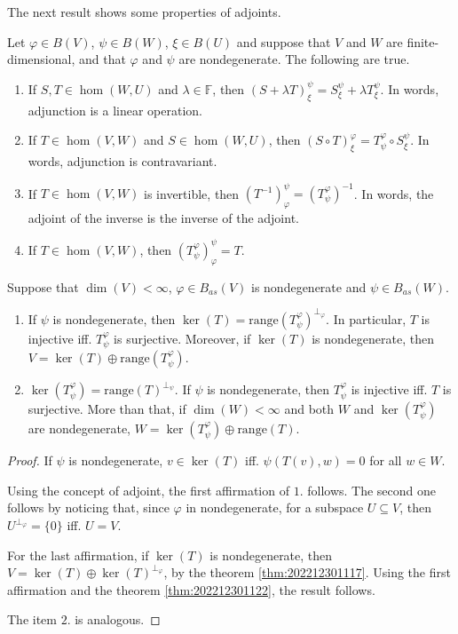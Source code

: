 The next result shows some properties of adjoints.

\begin{theorem}
  Let $\varphi \in B(V)$, $\psi \in B(W)$, $\xi \in B(U)$ and suppose that $V$ and $W$ are finite-dimensional, and that $\varphi$ and $\psi$ are nondegenerate. The following are true. 
  \begin{enumerate}
    \item If $S, T \in \hom(W, U)$ and $\lambda \in \mathbb{F}$, then $(S + \lambda T)_\xi^\psi = S_\xi^\psi + \lambda T_\xi^\psi$. In words, adjunction is a linear operation.
    \item If $T \in \hom(V, W)$ and $S \in \hom(W,U)$, then $(S \circ T)_\xi^\varphi = T_\psi^\varphi \circ S_\xi^\psi$. In words, adjunction is contravariant. 
    \item If $T \in \hom(V, W)$ is invertible, then $(T^{-1})_\varphi^\psi = (T_\psi^\varphi)^{-1}$. In words, the adjoint of the inverse is the inverse of the adjoint. 
    \item If $T \in \hom(V, W)$, then $(T_\psi^\varphi)_\varphi^\psi = T$.
  \end{enumerate}
\end{theorem}

\begin{lemma}
  Suppose that $\dim(V) < \infty$, $\varphi \in B_{as}(V)$ is nondegenerate and $\psi \in B_{as}(W)$. 

  \begin{enumerate}
    \item If $\psi$ is nondegenerate, then $\ker(T) = \text{range}(T_\psi^\varphi)^{\perp_\varphi}$. In particular, $T$ is injective iff. $T_\psi^\varphi$ is surjective. Moreover, if $\ker(T)$ is nondegenerate, then $V = \ker(T) \oplus \text{range}(T_\psi^\varphi)$. 
    \item $\ker(T_\psi^\varphi) = \text{range}(T)^{\perp_\psi}$. If $\psi$ is nondegenerate, then $T_\psi^\varphi$ is injective iff. $T$ is surjective. More than that, if $\dim(W) < \infty$ and both $W$ and $\ker(T_\psi^\varphi)$ are nondegenerate, $W = \ker(T_\psi^\varphi) \oplus \text{range}(T)$.
  \end{enumerate}
\end{lemma}

\begin{proof}
  If $\psi$ is nondegenerate, $v \in \ker(T)$ iff. $\psi(T(v), w) = 0$ for all $w \in W$.
  
  Using the concept of adjoint, the first affirmation of $1.$ follows. The second one follows by noticing that, since $\varphi$ in nondegenerate, for a subspace $U \subseteq V$, then $U^{\perp_\varphi} = \{ 0 \}$ iff. $U = V$.

  For the last affirmation, if $\ker(T)$ is nondegenerate, then $V = \ker(T) \oplus \ker(T)^{\perp_\varphi}$, by the theorem \ref{thm:202212301117}. Using the first affirmation and the theorem \ref{thm:202212301122}, the result follows. 

  The item $2.$ is analogous. 
\end{proof}

